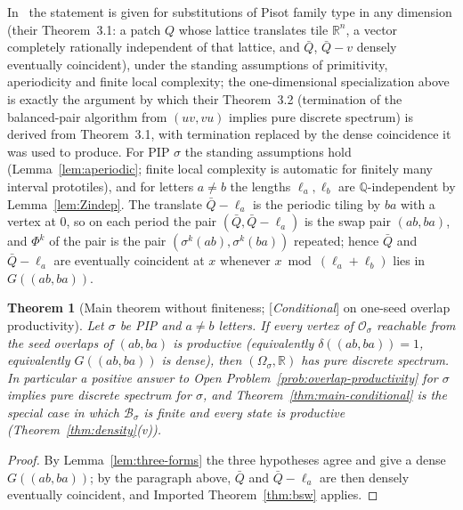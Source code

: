 \documentclass[11pt]{amsart}
\theoremstyle{plain}
\newtheorem{theorem}{Theorem}[section]
\theoremstyle{definition}
\theoremstyle{remark}
\newcommand{\Q}{\mathbb{Q}}
\newcommand{\R}{\mathbb{R}}
\newcommand{\B}{\mathcal{B}}
\newcommand{\PDS}{pure discrete spectrum}
\newcommand{\Status}[1]{\textup{[\textit{#1}]}}
\begin{document}
In~\cite{BSW} the statement is given for substitutions of Pisot family type in any dimension (their Theorem~3.1: a patch $Q$ whose lattice translates tile $\R^n$, a vector completely rationally independent of that lattice, and $\bar Q$, $\bar Q-v$ densely eventually coincident), under the standing assumptions of primitivity, aperiodicity and finite local complexity; the one-dimensional specialization above is exactly the argument by which their Theorem~3.2 (termination of the balanced-pair algorithm from $(uv,vu)$ implies \PDS{}) is derived from Theorem~3.1, with termination replaced by the dense coincidence it was used to produce. For PIP $\sigma$ the standing assumptions hold (Lemma~\ref{lem:aperiodic}; finite local complexity is automatic for finitely many interval prototiles), and for letters $a\ne b$ the lengths $\ell_a,\ell_b$ are $\Q$-independent by Lemma~\ref{lem:Zindep}. The translate $\bar Q-\ell_a$ is the periodic tiling by $ba$ with a vertex at $0$, so on each period the pair $(\bar Q,\bar Q-\ell_a)$ is the swap pair $(ab,ba)$, and $\Phi^k$ of the pair is the pair $(\sigma^k(ab),\sigma^k(ba))$ repeated; hence $\bar Q$ and $\bar Q-\ell_a$ are eventually coincident at $x$ whenever $x\bmod(\ell_a+\ell_b)$ lies in $G((ab,ba))$.

\begin{theorem}[Main theorem without finiteness; \Status{Conditional} on one-seed overlap productivity]\label{thm:main-density}
Let $\sigma$ be PIP and $a\ne b$ letters. If every vertex of $\mathcal O_\sigma$ reachable from the seed overlaps of $(ab,ba)$ is productive (equivalently $\delta((ab,ba))=1$, equivalently $G((ab,ba))$ is dense), then $(\Omega_\sigma,\R)$ has \PDS{}. In particular a positive answer to Open Problem~\ref{prob:overlap-productivity} for $\sigma$ implies \PDS{} for $\sigma$, and Theorem~\ref{thm:main-conditional} is the special case in which $\B_\sigma$ is finite and every state is productive (Theorem~\ref{thm:density}(v)).
\end{theorem}
\begin{proof}
By Lemma~\ref{lem:three-forms} the three hypotheses agree and give a dense $G((ab,ba))$; by the paragraph above, $\bar Q$ and $\bar Q-\ell_a$ are then densely eventually coincident, and Imported Theorem~\ref{thm:bsw} applies.
\end{proof}
\end{document}
